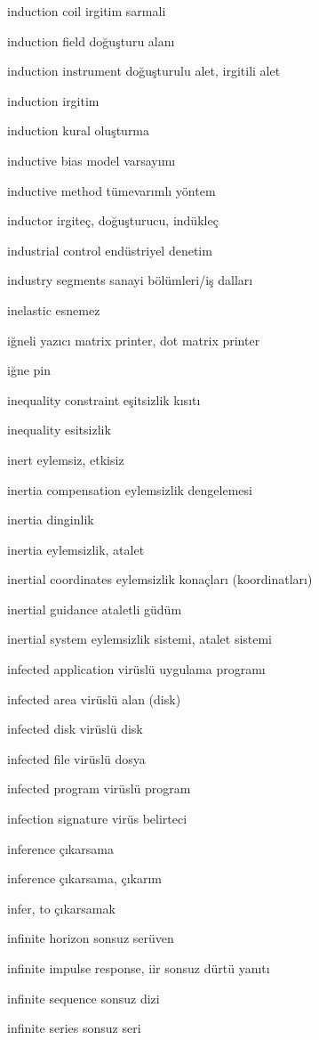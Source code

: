 \documentclass[12pt,fleqn]{article}\usepackage{../../common}
\begin{document}
induction coil irgitim sarmali

induction field doğuşturu alanı

induction instrument doğuşturulu alet, irgitili alet

induction irgitim

induction kural oluşturma

inductive bias model varsayımı

inductive method tümevarımlı yöntem

inductor irgiteç, doğuşturucu, indükleç

industrial control endüstriyel denetim

industry segments sanayi bölümleri/iş dalları

inelastic esnemez

iğneli yazıcı matrix printer, dot matrix printer

iğne pin

inequality constraint eşitsizlik kısıtı

inequality esitsizlik

inert eylemsiz, etkisiz

inertia compensation eylemsizlik dengelemesi

inertia dinginlik

inertia eylemsizlik, atalet

inertial coordinates eylemsizlik konaçları (koordinatları)

inertial guidance ataletli güdüm

inertial system eylemsizlik sistemi, atalet sistemi

infected application virüslü uygulama programı

infected area virüslü alan (disk)

infected disk virüslü disk

infected file virüslü dosya

infected program virüslü program

infection signature virüs belirteci

inference çıkarsama

inference çıkarsama, çıkarım

infer, to çıkarsamak

infinite horizon sonsuz serüven

infinite impulse response, iir sonsuz dürtü yanıtı

infinite sequence sonsuz dizi

infinite series sonsuz seri
\end{document}
